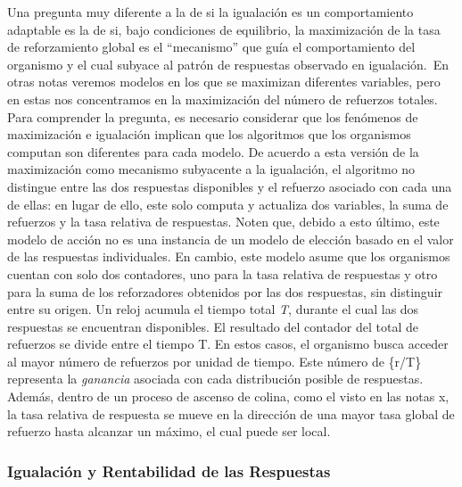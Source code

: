 \documentclass[
  letterpaper,
]{book}
\begin{document}
Una pregunta muy diferente a la de si la igualación es un comportamiento
adaptable es la de si, bajo condiciones de equilibrio, la maximización
de la tasa de reforzamiento global es el ``mecanismo'' que guía el
comportamiento del organismo y el cual subyace al patrón de respuestas
observado en igualación.~En otras notas veremos modelos en los que se
maximizan diferentes variables, pero en estas nos concentramos en la
maximización del número de refuerzos totales. Para comprender la
pregunta, es necesario considerar que los fenómenos de maximización e
igualación implican que los algoritmos que los organismos computan son
diferentes para cada modelo. De acuerdo a esta versión de la
maximización como mecanismo subyacente a la igualación, el algoritmo no
distingue entre las dos respuestas disponibles y el refuerzo asociado
con cada una de ellas: en lugar de ello, este solo computa y actualiza
dos variables, la suma de refuerzos y la tasa relativa de respuestas.
Noten que, debido a esto último, este modelo de acción no es una
instancia de un modelo de elección basado en el valor de las respuestas
individuales. En cambio, este modelo asume que los organismos cuentan
con solo dos contadores, uno para la tasa relativa de respuestas y otro
para la suma de los reforzadores obtenidos por las dos respuestas, sin
distinguir entre su origen. Un reloj acumula el tiempo total \emph{T},
durante el cual las dos respuestas se encuentran disponibles. El
resultado del contador del total de refuerzos se divide entre el tiempo
T. En estos casos, el organismo busca acceder al mayor número de
refuerzos por unidad de tiempo. Este número de \{r/T\} representa la
\emph{ganancia} asociada con cada distribución posible de respuestas.
Además, dentro de un proceso de ascenso de colina, como el visto en las
notas x, la tasa relativa de respuesta se mueve en la dirección de una
mayor tasa global de refuerzo hasta alcanzar un máximo, el cual puede
ser local.

\subsubsection{Igualación y Rentabilidad de las
Respuestas}\label{igualaciuxf3n-y-rentabilidad-de-las-respuestas}
\end{document}
